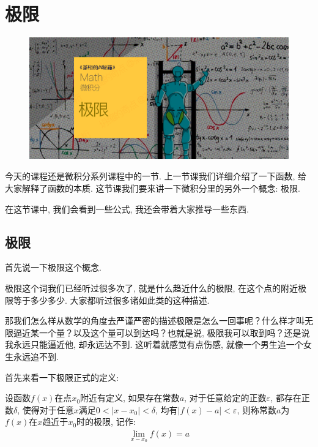 \chapter{极限}

\begin{figure}[ht]
  \centering
  \includegraphics[width=1\textwidth]{asset/茶桁的AI秘籍_Math_7.png}
\end{figure}

\newpage

今天的课程还是微积分系列课程中的一节. 上一节课我们详细介绍了一下函数, 给大家解释了函数的本质. 这节课我们要来讲一下微积分里的另外一个概念: 极限. 

在这节课中, 我们会看到一些公式, 我还会带着大家推导一些东西. 

\section{极限}

首先说一下极限这个概念. 

极限这个词我们已经听过很多次了, 就是什么趋近什么的极限, 在这个点的附近极限等于多少多少. 大家都听过很多诸如此类的这种描述. 

那我们怎么样从数学的角度去严谨严密的描述极限是怎么一回事呢？什么样才叫无限逼近某一个量？以及这个量可以到达吗？也就是说, 极限我可以取到吗？还是说我永远只能逼近他, 却永远达不到. 这听着就感觉有点伤感, 就像一个男生追一个女生永远追不到.

首先来看一下极限正式的定义: 

\begin{newquotation}
  设函数$f(x)$在点$x_0$附近有定义, 如果存在常数$a$, 对于任意给定的正数$\varepsilon$, 都存在正数$\delta$, 使得对于任意$x$满足$0<|x-x_0| < \delta$, 均有$|f(x)-a| < \varepsilon$, 则称常数$a$为$f(x)$在$x$趋近于$x_0$时的极限, 记作: 
  \begin{align*}
    \lim_{x-x_0}f(x) = a
  \end{align*}
\end{newquotation}

